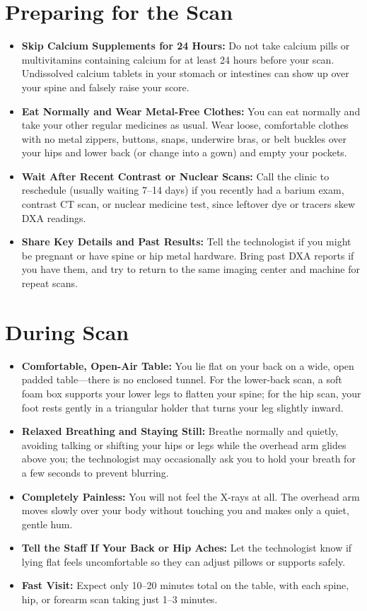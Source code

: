 \section{Preparing for the Scan}
\begin{itemize}
\item \textbf{Skip Calcium Supplements for 24 Hours:} Do not take calcium pills or multivitamins containing calcium for at least 24 hours before your scan. Undissolved calcium tablets in your stomach or intestines can show up over your spine and falsely raise your score.
\item \textbf{Eat Normally and Wear Metal-Free Clothes:} You can eat normally and take your other regular medicines as usual. Wear loose, comfortable clothes with no metal zippers, buttons, snaps, underwire bras, or belt buckles over your hips and lower back (or change into a gown) and empty your pockets.
\item \textbf{Wait After Recent Contrast or Nuclear Scans:} Call the clinic to reschedule (usually waiting 7--14 days) if you recently had a barium exam, contrast CT scan, or nuclear medicine test, since leftover dye or tracers skew DXA readings.
\item \textbf{Share Key Details and Past Results:} Tell the technologist if you might be pregnant or have spine or hip metal hardware. Bring past DXA reports if you have them, and try to return to the same imaging center and machine for repeat scans.
\end{itemize}

\section{During Scan}
\begin{itemize}
\item \textbf{Comfortable, Open-Air Table:} You lie flat on your back on a wide, open padded table---there is no enclosed tunnel. For the lower-back scan, a soft foam box supports your lower legs to flatten your spine; for the hip scan, your foot rests gently in a triangular holder that turns your leg slightly inward.
\item \textbf{Relaxed Breathing and Staying Still:} Breathe normally and quietly, avoiding talking or shifting your hips or legs while the overhead arm glides above you; the technologist may occasionally ask you to hold your breath for a few seconds to prevent blurring.
\item \textbf{Completely Painless:} You will not feel the X-rays at all. The overhead arm moves slowly over your body without touching you and makes only a quiet, gentle hum.
\item \textbf{Tell the Staff If Your Back or Hip Aches:} Let the technologist know if lying flat feels uncomfortable so they can adjust pillows or supports safely.
\item \textbf{Fast Visit:} Expect only 10--20 minutes total on the table, with each spine, hip, or forearm scan taking just 1--3 minutes.
\end{itemize}

